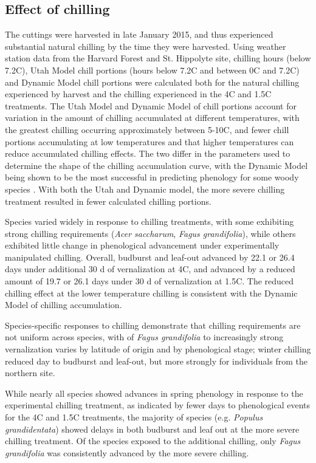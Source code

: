 \documentclass[11pt]{article}
\begin{document}
\subsection*{Effect of chilling}
The cuttings were harvested in late January 2015, and thus experienced substantial natural chilling by the time they were harvested. Using weather station data from the Harvard Forest and St. Hippolyte site, chilling hours (below 7.2\degree C), Utah Model chill portions (hours below 7.2\degree C and between 0\degree C and 7.2\degree C) and Dynamic Model \cite{Erez:1988} chill portions were calculated both for the natural chilling experienced by harvest and the chilling experienced in the 4\degree C and 1.5\degree C treatments. The Utah Model and Dynamic Model of chill portions account for variation in the amount of chilling accumulated at different temperatures, with the greatest chilling occurring approximately between 5-10\degree C, and fewer chill portions accumulating at low temperatures and that higher temperatures can reduce accumulated chilling effects. The two differ in the parameters used to determine the shape of the chilling accumulation curve, with the Dynamic Model being shown to be the most successful in predicting phenology for some woody species \cite{Luedeling:2009}.
With both the Utah and Dynamic model, the more severe chilling treatment resulted in fewer calculated chilling portions. 

Species varied widely in response to chilling treatments, with some exhibiting strong chilling requirements (\emph{Acer saccharum}, \emph{Fagus grandifolia}), while others exhibited little change in phenological advancement under experimentally manipulated chilling. Overall, budburst and leaf-out advanced by 22.1 or 26.4 days under additional 30 d of vernalization at 4\degree C, and advanced by a reduced amount of 19.7 or 26.1 days under 30 d of vernalization at 1.5\degree C. The reduced chilling effect at the lower temperature chilling is consistent with the Dynamic Model of chilling accumulation. %

Species-specific responses to chilling demonstrate that chilling requirements are not uniform across species, with 
of \emph{Fagus grandifolia} to increasingly strong vernalization varies by latitude of origin and by phenological stage; winter chilling reduced day to budburst and leaf-out, but more strongly for individuals from the northern site.

While nearly all species showed advances in spring phenology in response to the experimental chilling treatment, as indicated by fewer days to phenological events for the 4\degree C and 1.5\degree C treatments, the majority of species (e.g. \emph{Populus grandidentata}) showed delays in both budburst and leaf out at the more severe chilling treatment. Of the species exposed to the additional chilling, only \emph{Fagus grandifolia} was consistently advanced by the more severe chilling.
\end{document}
